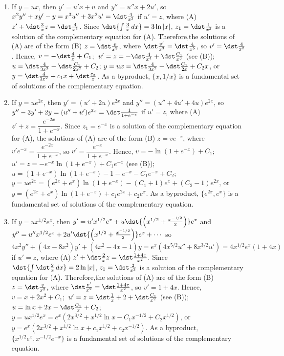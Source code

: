 \documentclass[openany]{book}
\newenvironment{sectionSolutions}{
 \begin{enumerate}[item-label={\thesection.\arabic{enumi}.}]
}{
 \end{enumerate}
}
\begin{document}
\begin{sectionSolutions}

\item
If $y=ux$, then $y'=u'x+u$ and $y''=u''x+2u'$, so
$x^2y''+xy'-y=x^3u''+3x^2u'=\dst\frac{4}{ x^2}$ if $u'=z$, where (A)
$z'+\dst\frac{3}{ x}z=\dst\frac{4}{ x^5}$. Since $\dst{\int\frac{3}{
x}\,dx}=3\ln|x|$, $z_1=\dst\frac{1}{ x^3}$ is a solution of the
complementary equation for (A). Therefore,the solutions of (A) are of
the form (B) $z=\dst\frac{v}{ x^3}$, where $\dst\frac{v'}{
x^3}=\dst\frac{4}{ x^5}$, so $v'=\dst\frac{4}{ x^2}$. Hence,
$v=-\dst\frac{4}{ x}+C_1$;\ $u'=z=-\dst\frac{4}{ x^4}+\dst\frac{C_1}{ x^3}$
(see (B));\ $u=\dst\frac{4}{ 3x^3}-\dst\frac{C_1}{2x^2}+C_2$;\;
$y=ux=\dst\frac{4}{ 3x^2}-\dst\frac{C_1}{2x}+C_2x$, or $y=\dst\frac{4}{
3x^2}+c_1x+\dst\frac{c_2}{ x}$. As a byproduct, $\{x,1/x\}$ is a
fundamental set of solutions of the complementary equation.


\item
If $y=ue^{2x}$, then $y'=(u'+2u)e^{2x}$ and $y''=(u''+4u'+4u)e^{2x}$,
so $y''-3y'+2y=(u''+u')e^{2x}=\dst\frac{1}{1+e^{-x}}$ if $u'=z$, where
(A) $z'+z=\dfrac{e^{-2x}}{1+e^{-x}}$. Since $z_1=e^{-x}$ is a
solution of the complementary equation for (A), the solutions of (A)
are of the form (B) $z=ve^{-x}$, where
$v'e^{-x}=\dfrac{e^{-2x}}{1+e^{-x}}$, so
$v'=\dfrac{e^{-x}}{1+e^{-x}}$. Hence, $v=-\ln(1+e^{-x})+C_1$;\;
$u'=z=-e^{-x}\ln(1+e^{-x})+C_1e^{-x}$ (see (B));\;
$u=(1+e^{-x})\ln(1+e^{-x})-1-e^{-x}-C_1e^{-x}+C_2$;\;
$y=ue^{2x}=(e^{2x}+e^x)\ln(1+e^{-x})-(C_1+1)e^x+(C_2-1)e^{2x}$, or
$y=(e^{2x}+e^x) \ln (1+e^{-x})+c_1e^{2x}+c_2e^x$. As a byproduct,
$\{e^{2x},e^x\}$ is a fundamental set of solutions of the
complementary equation.


\item
If $y=ux^{1/2}e^x$, then
$y'=u'x^{1/2}e^x+u\dst{\left(x^{1/2}+\frac{x^{-1/2}}{2}\right)}e^x$ and
$y''=u''x^{1/2}e^x+2u'\dst{\left(x^{1/2}+\frac{x^{-1/2}}{2}\right)}e^x+\cdots$
so $4x^2y''+(4x-8x^2)y'+(4x^2-4x-1)y=e^x(4x^{5/2}u''+8x^{3/2}u')
=4x^{1/2}e^x(1+4x)$ if $u'=z$, where (A) $z'+\dst\frac{2}{
x}z=\dst\frac{1+4x}{ x^2}$. Since $\dst{\int\dst\frac{2}{ x}\,dx}=
2\ln|x|$, $z_1=\dst\frac{2}{ x^2}$ is a solution of the complementary
equation for (A). Therefore,the solutions of (A) are of the form (B)
$z=\dst\frac{v}{ x^2}$, where $\dst\frac{v'}{ x^2}=\dst\frac{1+4x}{ x^2}$,
so $v'=1+4x$. Hence, $v=x+2x^2+C_1$;\ $u'=z=\dst\frac{1}{
x}+2+\dst\frac{C_1}{ x^2}$ (see (B));\ $u=\ln x+2x-\dst\frac{C_1}{
x}+C_2$;\ $y=ux^{1/2}e^x=e^x(2x^{3/2}+x^{1/2}\ln
x-C_1x^{-1/2}+C_2x^{1/2})$, or $y=e^x(2x^{3/2}+x^{1/2}\ln
x+c_1x^{1/2}+c_2x^{-1/2})$. As a byproduct,
$\{x^{1/2}e^x,x^{-1/2}e^{-x}\}$ is a fundamental set of solutions of
the complementary equation.



\end{sectionSolutions}
\end{document}

